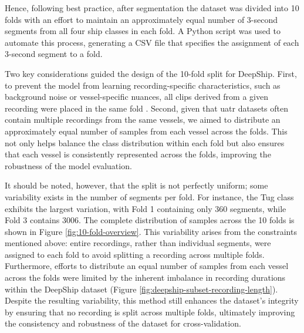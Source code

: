 Hence, following best practice, after segmentation the dataset was divided into 10 folds with an effort to maintain an approximately equal number of 3-second segments from all four ship classes in each fold. A Python script was used to automate this process, generating a CSV file that specifies the assignment of each 3-second segment to a fold.

Two key considerations guided the design of the 10-fold split for DeepShip. First, to prevent the model from learning recording-specific characteristics, such as background noise or vessel-specific nuances, all clips derived from a given recording were placed in the same fold \cite{chi_classifying_2022}. Second, given that \acrshort{uatr} datasets often contain multiple recordings from the same vessels, we aimed to distribute an approximately equal number of samples from each vessel across the folds. This not only helps balance the class distribution within each fold but also ensures that each vessel is consistently represented across the folds, improving the robustness of the model evaluation.

It should be noted, however, that the split is not perfectly uniform; some variability exists in the number of segments per fold. For instance, the Tug class exhibits the largest variation, with Fold 1 containing only 360 segments, while Fold 3 contains 3006. The complete distribution of samples across the 10 folds is shown in Figure \ref{fig:10-fold-overview}. This variability arises from the constraints mentioned above: entire recordings, rather than individual segments, were assigned to each fold to avoid splitting a recording across multiple folds. Furthermore, efforts to distribute an equal number of samples from each vessel across the folds were limited by the inherent imbalance in recording durations within the DeepShip dataset (Figure \ref{fig:deepship-subset-recording-length}). Despite the resulting variability, this method still enhances the dataset's integrity by ensuring that no recording is split across multiple folds, ultimately improving the consistency and robustness of the dataset for cross-validation.

